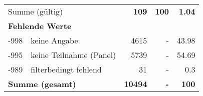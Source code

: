 \begin{longtable}{lXrrr}
     \midrule
     \multicolumn{2}{l}{Summe (gültig)} &
       \textbf{\num{109}} &
     \textbf{\num{100}} &
       \textbf{\num[round-mode=places,round-precision=2]{1.04}} \\
     \multicolumn{5}{l}{\textbf{Fehlende Werte}}\\
       -998 &
       keine Angabe &
         \num{4615} &
        - &
         \num[round-mode=places,round-precision=2]{43.98} \\
       -995 &
       keine Teilnahme (Panel) &
         \num{5739} &
        - &
         \num[round-mode=places,round-precision=2]{54.69} \\
       -989 &
       filterbedingt fehlend &
         \num{31} &
        - &
         \num[round-mode=places,round-precision=2]{0.3} \\
     \midrule
     \multicolumn{2}{l}{\textbf{Summe (gesamt)}} &
          \textbf{\num{10494}} &
        \textbf{-} &
        \textbf{\num{100}} \\
     \bottomrule
     \end{longtable}
     
